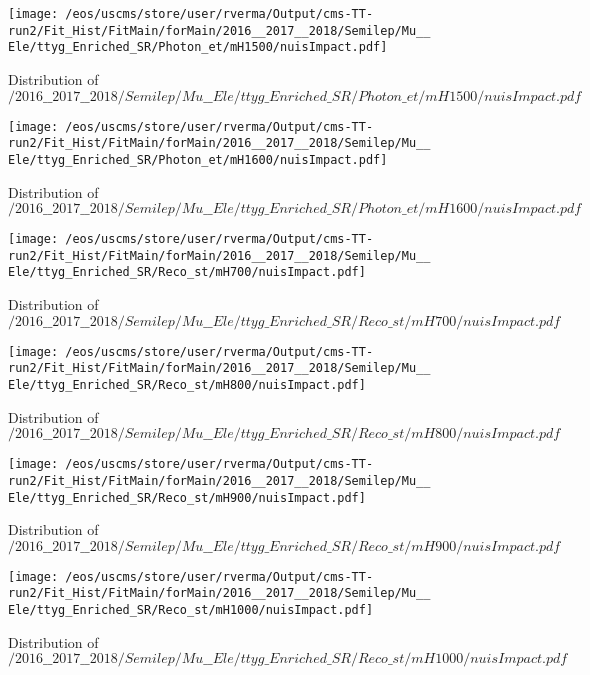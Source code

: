 \begin{figure}
\centering
\texttt{[image: /eos/uscms/store/user/rverma/Output/cms-TT-run2/Fit\_Hist/FitMain/forMain/2016\_\_2017\_\_2018/Semilep/Mu\_\_Ele/ttyg\_Enriched\_SR/Photon\_et/mH1500/nuisImpact.pdf]}
\caption{Distribution of $/2016\_\_2017\_\_2018/Semilep/Mu\_\_Ele/ttyg\_Enriched\_SR/Photon\_et/mH1500/nuisImpact.pdf$}
\end{figure}

\begin{figure}
\centering
\texttt{[image: /eos/uscms/store/user/rverma/Output/cms-TT-run2/Fit\_Hist/FitMain/forMain/2016\_\_2017\_\_2018/Semilep/Mu\_\_Ele/ttyg\_Enriched\_SR/Photon\_et/mH1600/nuisImpact.pdf]}
\caption{Distribution of $/2016\_\_2017\_\_2018/Semilep/Mu\_\_Ele/ttyg\_Enriched\_SR/Photon\_et/mH1600/nuisImpact.pdf$}
\end{figure}

\begin{figure}
\centering
\texttt{[image: /eos/uscms/store/user/rverma/Output/cms-TT-run2/Fit\_Hist/FitMain/forMain/2016\_\_2017\_\_2018/Semilep/Mu\_\_Ele/ttyg\_Enriched\_SR/Reco\_st/mH700/nuisImpact.pdf]}
\caption{Distribution of $/2016\_\_2017\_\_2018/Semilep/Mu\_\_Ele/ttyg\_Enriched\_SR/Reco\_st/mH700/nuisImpact.pdf$}
\end{figure}

\begin{figure}
\centering
\texttt{[image: /eos/uscms/store/user/rverma/Output/cms-TT-run2/Fit\_Hist/FitMain/forMain/2016\_\_2017\_\_2018/Semilep/Mu\_\_Ele/ttyg\_Enriched\_SR/Reco\_st/mH800/nuisImpact.pdf]}
\caption{Distribution of $/2016\_\_2017\_\_2018/Semilep/Mu\_\_Ele/ttyg\_Enriched\_SR/Reco\_st/mH800/nuisImpact.pdf$}
\end{figure}

\begin{figure}
\centering
\texttt{[image: /eos/uscms/store/user/rverma/Output/cms-TT-run2/Fit\_Hist/FitMain/forMain/2016\_\_2017\_\_2018/Semilep/Mu\_\_Ele/ttyg\_Enriched\_SR/Reco\_st/mH900/nuisImpact.pdf]}
\caption{Distribution of $/2016\_\_2017\_\_2018/Semilep/Mu\_\_Ele/ttyg\_Enriched\_SR/Reco\_st/mH900/nuisImpact.pdf$}
\end{figure}

\begin{figure}
\centering
\texttt{[image: /eos/uscms/store/user/rverma/Output/cms-TT-run2/Fit\_Hist/FitMain/forMain/2016\_\_2017\_\_2018/Semilep/Mu\_\_Ele/ttyg\_Enriched\_SR/Reco\_st/mH1000/nuisImpact.pdf]}
\caption{Distribution of $/2016\_\_2017\_\_2018/Semilep/Mu\_\_Ele/ttyg\_Enriched\_SR/Reco\_st/mH1000/nuisImpact.pdf$}
\end{figure}


